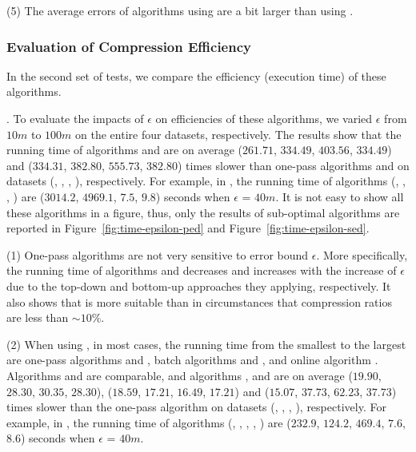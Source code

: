 \sstab (5) The average errors of algorithms using \sed are a bit larger than using \ped. 



\subsubsection{Evaluation of Compression Efficiency}

In the second set of tests, we compare the efficiency (execution time) of these algorithms.


.
To evaluate the impacts of $\epsilon$ on efficiencies of these algorithms, we varied $\epsilon$ from $10m$ to $100m$ on the entire four datasets, respectively.
%
The results show that the running time of algorithms \optp and \nopts are on
average ($261.71$, $334.49$, $403.56$, $334.49$) and ($334.31$, $382.80$, $555.73$, $382.80$) times slower than one-pass algorithms \siped and \cised on datasets (\ucar, \geolife, \mopsi, \act), respectively. 
For example, in \mopsi, the running time of algorithms
(\optp, \nopts, \siped, \cised) are  {($3014.2$, $4969.1$, $7.5$, $9.8$)} seconds when $\epsilon$ = $40m$.
%
It is not easy to show all these algorithms in a figure, thus, only the results of sub-optimal algorithms are reported in Figure~\ref{fig:time-epsilon-ped} and Figure~\ref{fig:time-epsilon-sed}.

\sstab (1) One-pass algorithms are not very sensitive to error bound $\epsilon$. 
More specifically, the running time of algorithms \dpa and \tpa decreases and increases with the increase of $\epsilon$ due to the top-down and bottom-up approaches they applying, respectively. It also shows that \dpa is more suitable than \tpa in circumstances that compression ratios are less than $\sim 10\%$.

\sstab (2) When using \ped, in most cases, the running time from the smallest to the largest are one-pass algorithms \siped and \operb, batch algorithms \tpa and \dpa, and online algorithm \bqsa. 
Algorithms \siped and \operb are comparable, and algorithms \tpa, \dpa and \bqsa are on average
($19.90$, $28.30$, $30.35$, $28.30$), ($18.59$, $17.21$, $16.49$, $17.21$) and ($15.07$, $37.73$, $62.23$, $37.73$)
times slower than the one-pass algorithm \siped on datasets (\ucar, \geolife, \mopsi, \act), respectively.
% 
For example, in \mopsi, the running time of algorithms
(\tpa, \dpa, \bqsa, \siped, \operb ) are ($232.9$, $124.2$, $469.4$, $7.6$, $8.6$) seconds when $\epsilon$ = $40m$.

